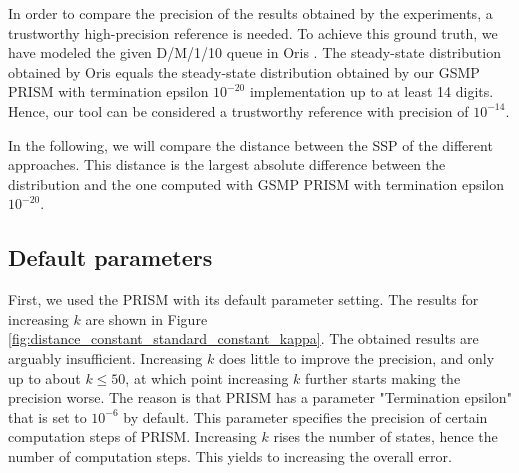 \documentclass[runningheads,custombib]{llncs}
\begin{document}
	
	In order to compare the precision of the results obtained by the experiments, a trustworthy high-precision reference is needed. To achieve this ground truth, we have modeled the given D/M/1/10 queue in Oris \cite{Bucci2010}. The steady-state distribution obtained by Oris equals the steady-state distribution obtained by our GSMP PRISM with termination epsilon $10^{-20}$ implementation up to at least 14 digits. Hence, our tool can be considered a trustworthy reference with precision of $10^{-14}$.
	
	In the following, we will compare the distance between the SSP of the different approaches. This distance is the largest absolute difference between the distribution and the one computed with GSMP PRISM with termination epsilon $10^{-20}$.

	\subsection{Default parameters}
	\label{default_absolute}
	
	First, we used the PRISM with its default parameter setting. The results for increasing $k$ are shown in Figure \ref{fig:distance_constant_standard_constant_kappa}. The obtained results are arguably insufficient. Increasing $k$ does little to improve the precision, and only up to about $k \leq 50$, at which point increasing $k$ further starts making the precision worse. The reason is that PRISM has a parameter "Termination epsilon" that is set to $10^{-6}$ by default. This parameter specifies the precision of certain computation steps of PRISM. Increasing $k$ rises the number of states, hence the number of computation steps. This yields to increasing the overall error. 
	
\end{document}
